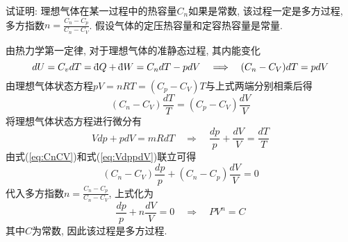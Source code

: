 \begin{problem}[1.9]
试证明: 理想气体在某一过程中的热容量$C_n$如果是常数, 该过程一定是多方过程, 多方指数$n=\frac{C_n-C_p}{C_n-C_V}$. 假设气体的定压热容量和定容热容量是常量.
\end{problem}
\begin{solution}
由热力学第一定律, 对于理想气体的准静态过程, 其内能变化
\[
dU = C_v dT = \dbar Q + \dbar W = C_n dT -pdV \quad\Longrightarrow\quad (C_n-C_V)dT = pdV
\]
由理想气体状态方程$pV = nRT=(C_p-C_V)T$与上式两端分别相乘后得
\begin{equation}\label{eq:CnCV}
(C_n-C_V)\frac{dT}{T} = (C_p-C_V)\frac{dV}{V}
\end{equation}
将理想气体状态方程进行微分有
\begin{equation}\label{eq:VdppdV}
Vdp + pdV = mR dT \quad\Longrightarrow\quad \frac{dp}{p} + \frac{dV}{V} = \frac{dT}{T}
\end{equation}
由式(\ref{eq:CnCV})和式(\ref{eq:VdppdV})联立可得
\[
(C_n-C_V)\frac{dp}{p} + (C_n-C_p)\frac{dV}{V} = 0
\]
代入多方指数$n=\frac{C_n-C_p}{C_n-C_V}$, 上式化为
\[
\frac{dp}{p} + n\frac{dV}{V} = 0 \quad\Longrightarrow\quad  PV^n=C
\]
其中$C$为常数, 因此该过程是多方过程.
\end{solution}
